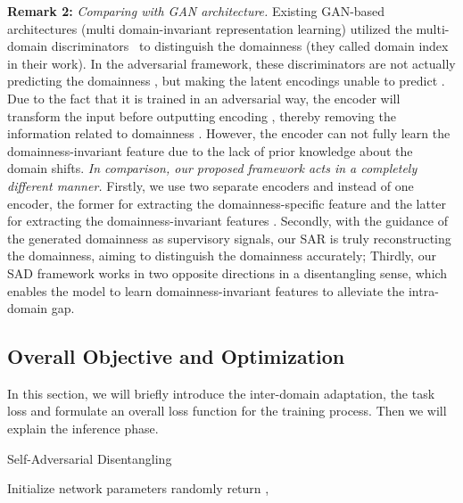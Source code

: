 \documentclass[10pt,journal,compsoc]{IEEEtran}
\begin{document}
\noindent \textbf{Remark 2:} \textit{Comparing with GAN architecture.} 
Existing GAN-based architectures (multi domain-invariant representation learning) utilized the multi-domain discriminators~\cite{DDMRL,CIDA} to distinguish the domainness (they called domain index in their work). In the adversarial framework, these discriminators are not actually predicting the domainness , but making the latent encodings  unable to predict . Due to the fact that it is trained in an adversarial way, the encoder will transform the input  before outputting encoding , thereby removing the information related to domainness . 
However, the encoder can not fully learn the domainness-invariant feature due to the lack of prior knowledge about the domain shifts. 
\textit{In comparison, our proposed framework acts in a completely different manner.} Firstly, we use two separate encoders  and  instead of one encoder, the former for extracting the domainness-specific feature  and the latter for extracting the domainness-invariant features . Secondly, with the guidance of the generated domainness  as supervisory signals, our SAR is truly reconstructing the domainness, aiming to distinguish the domainness accurately; Thirdly,  our SAD framework works in two opposite directions in a disentangling sense, which enables the model to learn domainness-invariant features to alleviate the intra-domain gap.


\subsection{Overall Objective and Optimization}
\label{END-TO-END}
 In this section, we will briefly introduce the inter-domain adaptation, the task loss and formulate an overall loss function for the training process. Then we will explain the inference phase.

\begin{algorithm}[htb!]
	\caption{Self-Adversarial Disentangling}
	\label{algorithm 1}
	Initialize network parameters  randomly\;
	return , 
\end{algorithm}
\end{document}
